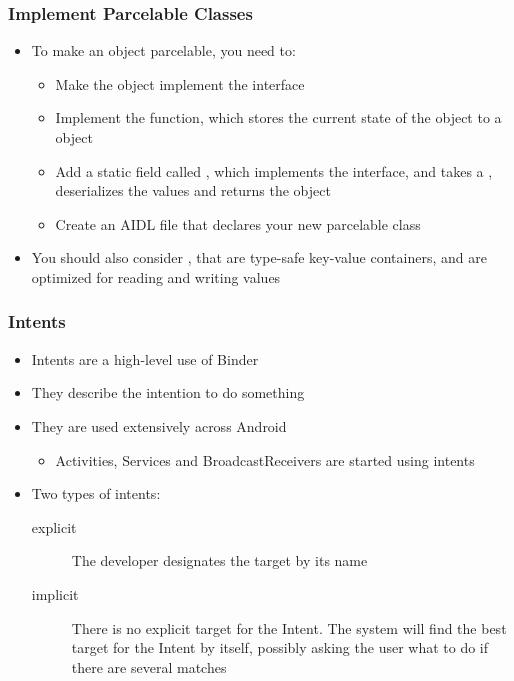 \begin{frame}[fragile]
  \frametitle{Implement Parcelable Classes}
  \begin{itemize}
  \item To make an object parcelable, you need to:
    \begin{itemize}
    \item Make the object implement the  interface
    \item Implement the  function, which stores
      the current state of the object to a  object
    \item Add a static field called , which implements
      the  interface, and takes a
      , deserializes the values and returns the object
    \item Create an AIDL file that declares your new parcelable class
    \end{itemize}
  \item You should also consider , that are type-safe
    key-value containers, and are optimized for reading and writing
    values
  \end{itemize}
\end{frame}

\begin{frame}
  \frametitle{Intents}
  \begin{itemize}
  \item Intents are a high-level use of Binder
  \item They describe the intention to do something
  \item They are used extensively across Android
    \begin{itemize}
    \item Activities, Services and BroadcastReceivers are started
      using intents
    \end{itemize}
  \item Two types of intents:
    \begin{description}
    \item[explicit] The developer designates the target by its name 
    \item[implicit] There is no explicit target for the Intent. The
      system will find the best target for the Intent by itself, possibly
      asking the user what to do if there are several matches
    \end{description}
  \end{itemize}
\end{frame}
